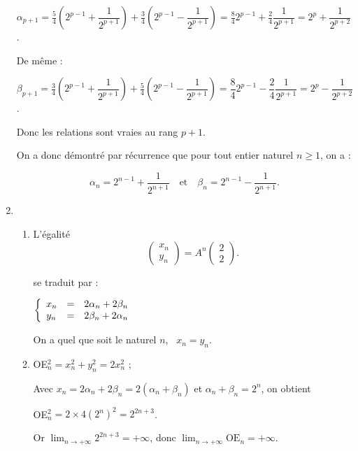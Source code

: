 \documentclass[10pt]{article}
\begin{document}
\begin{enumerate}
$\alpha_{p+1} = \frac{5}{4}\left(2^{p-1}  + \dfrac{1}{2^{p+1}}\right) + \frac{3}{4}\left(2^{p-1}  - \dfrac{1}{2^{p+1}} \right) = \frac{8}{4}2^{p-1} + \frac{2}{4}\dfrac{1}{2^{p+1}} = 2^p + \dfrac{1}{2^{p+2}}$.

De même : 

$\beta_{p+1} = \frac{3}{4}\left(2^{p-1}  + \dfrac{1}{2^{p+1}}\right) + \frac{5}{4}\left(2^{p-1}  - \dfrac{1}{2^{p+1}} \right) = \dfrac{8}{4}2^{p-1} - \dfrac{2}{4}\dfrac{1}{2^{p+1}} = 2^p  - \dfrac{1}{2^{p+2}}$.

Donc les relations sont vraies au rang $p + 1$.

On a donc démontré par récurrence que pour tout entier naturel $n \geqslant 1$, on a : 

\[\alpha_{n} = 2^{n-1}  + \dfrac{1}{2^{n+1}} \quad \text{et}\quad  \beta_{n} = 2^{n-1}  - \dfrac{1}{2^{n+1}}.\]
\item 
	\begin{enumerate}
		\item %
		 

L'égalité 
\[\begin{pmatrix}x_{n}\\y_{n}\end{pmatrix} = A^n \begin{pmatrix}2\\2\end{pmatrix}.\]

se traduit par :

$\left\{\begin{array}{l c l}
x_{n}&=&2\alpha_{n} + 2\beta_{n}\\
y_{n}&=&2\beta_{n} + 2\alpha_{n}
\end{array}\right.$

On a quel que soit le naturel $n$, \, $x_{n} = y_{n}$.
 
		\item %
OE$_{n}^2  = x_{n}^2 + y_{n}^2 = 2x_{n}^2$ ; 

Avec $x_{n} = 2\alpha_{n} + 2\beta_{n} = 2\left(\alpha_{n} + \beta_{n} \right)$ et $\alpha_{n} + \beta_{n} = 2^n$, on obtient 

OE$_{n}^2  = 2 \times 4 \left(2^n \right)^2 = 2^{2n + 3}$.

Or $\displaystyle\lim_{n \to + \infty}  2^{2n+3} = + \infty$, donc $\displaystyle\lim_{n \to + \infty} \text{OE}_{n} = + \infty$.
	\end{enumerate}
\end{enumerate}
\end{document}
